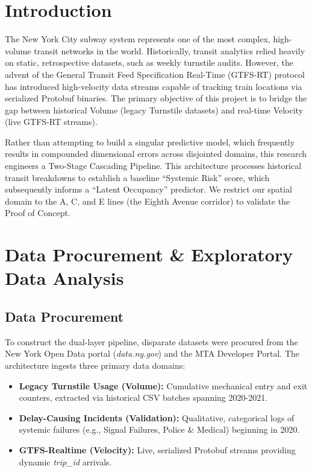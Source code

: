 \documentclass[conference]{IEEEtran}
\begin{document}
\section{Introduction}
The New York City subway system represents one of the most complex, high-volume transit networks in the world. Historically, transit analytics relied heavily on static, retrospective datasets, such as weekly turnstile audits. However, the advent of the General Transit Feed Specification Real-Time (GTFS-RT) protocol has introduced high-velocity data streams capable of tracking train locations via serialized Protobuf binaries. The primary objective of this project is to bridge the gap between historical Volume (legacy Turnstile datasets) and real-time Velocity (live GTFS-RT streams).

Rather than attempting to build a singular predictive model, which frequently results in compounded dimensional errors across disjointed domains, this research engineers a Two-Stage Cascading Pipeline. This architecture processes historical transit breakdowns to establish a baseline ``Systemic Risk'' score, which subsequently informs a ``Latent Occupancy'' predictor. We restrict our spatial domain to the A, C, and E lines (the Eighth Avenue corridor) to validate the Proof of Concept.

\section{Data Procurement \& Exploratory Data Analysis}

\subsection{Data Procurement}
To construct the dual-layer pipeline, disparate datasets were procured from the New York Open Data portal (\textit{data.ny.gov}) and the MTA Developer Portal. The architecture ingests three primary data domains:
\begin{itemize}
    \item \textbf{Legacy Turnstile Usage (Volume):} Cumulative mechanical entry and exit counters, extracted via historical CSV batches spanning 2020-2021.
    \item \textbf{Delay-Causing Incidents (Validation):} Qualitative, categorical logs of systemic failures (e.g., Signal Failures, Police \& Medical) beginning in 2020.
    \item \textbf{GTFS-Realtime (Velocity):} Live, serialized Protobuf streams providing dynamic \textit{trip\_id} arrivals.
\end{itemize}
\end{document}
